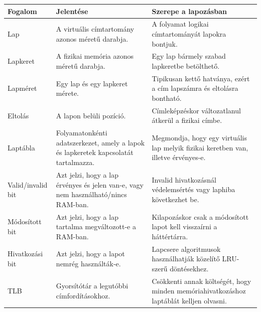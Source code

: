 \begin{tabularx}{\textwidth}{L{30mm}X X}
\toprule
\textbf{Fogalom} & \textbf{Jelentése} & \textbf{Szerepe a lapozásban} \\
\midrule
Lap & A virtuális címtartomány azonos méretű darabja. & A folyamat logikai címtartományát lapokra bontjuk. \\
Lapkeret & A fizikai memória azonos méretű darabja. & Egy lap bármely szabad lapkeretbe betölthető. \\
Lapméret & Egy lap és egy lapkeret mérete. & Tipikusan kettő hatványa, ezért a cím lapszámra és eltolásra bontható. \\
Eltolás & A lapon belüli pozíció. & Címleképzéskor változatlanul átkerül a fizikai címbe. \\
Laptábla & Folyamatonkénti adatszerkezet, amely a lapok és lapkeretek kapcsolatát tartalmazza. & Megmondja, hogy egy virtuális lap melyik fizikai keretben van, illetve érvényes-e. \\
Valid/invalid bit & Azt jelzi, hogy a lap érvényes és jelen van-e, vagy nem használható/nincs RAM-ban. & Invalid hivatkozásnál védelemsértés vagy laphiba következhet be. \\
Módosított bit & Azt jelzi, hogy a lap tartalma megváltozott-e a RAM-ban. & Kilapozáskor csak a módosított lapot kell visszaírni a háttértárra. \\
Hivatkozási bit & Azt jelzi, hogy a lapot nemrég használták-e. & Lapcsere algoritmusok használhatják közelítő LRU-szerű döntésekhez. \\
TLB & Gyorsítótár a legutóbbi címfordításokhoz. & Csökkenti annak költségét, hogy minden memóriahivatkozáshoz laptáblát kelljen olvasni. \\
\bottomrule
\end{tabularx}
